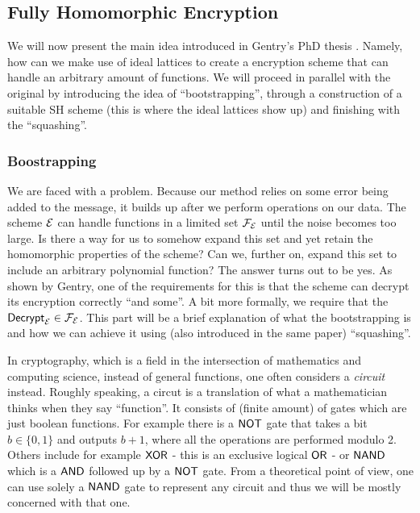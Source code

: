 \subsection{Fully Homomorphic Encryption}
We will now present the main idea introduced in Gentry's PhD thesis \cite{gentry_phd}. Namely, how can we make use of ideal lattices to create a encryption scheme that can handle an arbitrary amount of functions. We will proceed in parallel with the original by introducing the idea of ``bootstrapping'', through a construction of a suitable SH scheme (this is where the ideal lattices show up) and finishing with the ``squashing''.

\subsubsection{Boostrapping}
We are faced with a problem. Because our method relies on some error being added to the message, it builds up after we perform operations on our data. The scheme $\mathcal{E}$ can handle functions in a limited set $\mathcal{F}_{\mathcal{E}}$ until the noise becomes too large. Is there a way for us to somehow expand this set and yet retain the homomorphic properties of the scheme? Can we, further on, expand this set to include an arbitrary polynomial function? The answer turns out to be yes. As shown by Gentry, one of the requirements for this is that the scheme can decrypt its encryption correctly ``and some''. A bit more formally, we require that the $\alg{Decrypt}_{\E} \in \mathcal{F}_{\E}$. This part will be a brief explanation of what the bootstrapping is and how we can achieve it using (also introduced in the same paper) ``squashing''.

\begin{remark}
  In cryptography, which is a field in the intersection of mathematics and computing science, instead of general functions, one often considers a \textit{circuit} instead. Roughly speaking, a circut is a translation of what a mathematician thinks when they say ``function''. It consists of (finite amount) of gates which are just boolean functions. For example there is a $\alg{NOT}$ gate that takes a bit $b \in \{0,1\}$ and outputs $b + 1$, where all the operations are performed modulo 2. Others include for example $\alg{XOR}$ - this is an exclusive logical $\alg{OR}$ - or $\alg{NAND}$ which is a $\alg{AND}$ followed up by a $\alg{NOT}$ gate. From a theoretical point of view, one can use solely a $\alg{NAND}$ gate to represent any circuit and thus we will be mostly concerned with that one.
\end{remark}

